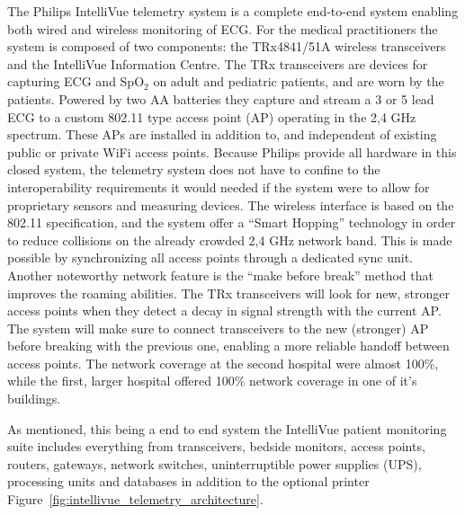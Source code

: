The Philips IntelliVue telemetry system is a complete end-to-end system enabling both wired and wireless monitoring of ECG. For the medical practitioners the system is composed of two components: the TRx4841/51A wireless transceivers and the IntelliVue Information Centre. The TRx transceivers are devices for capturing ECG and SpO$_2$ on adult and pediatric patients, and are worn by the patients. Powered by two AA batteries they capture and stream a 3 or 5 lead ECG to a custom 802.11 type access point (AP) operating in the 2,4 GHz spectrum. These APs are installed in addition to, and independent of existing public or private WiFi access points. Because Philips provide all hardware in this closed system, the telemetry system does not have to confine to the interoperability requirements it would needed if the system were to allow for proprietary sensors and measuring devices. The wireless interface is based on the 802.11 specification, and the system offer a ``Smart Hopping'' technology in order to reduce collisions on the already crowded 2,4 GHz network band. This is made possible by synchronizing all access points through a dedicated sync unit. Another noteworthy network feature is the ``make before break'' method that improves the roaming abilities. The TRx transceivers will look for new, stronger access points when they detect a decay in signal strength with the current AP. The system will make sure to connect transceivers to the new (stronger) AP before breaking with the previous one, enabling a more reliable handoff between access points. The network coverage at the second hospital were almost 100\%, while the first, larger hospital offered 100\% network coverage in one of it's buildings.

As mentioned, this being a end to end system the IntelliVue patient monitoring suite includes everything from transceivers, bedside monitors, access points, routers, gateways, network switches, uninterruptible power supplies (UPS), processing units and databases in addition to the optional printer Figure~\ref{fig:intellivue_telemetry_architecture}.


